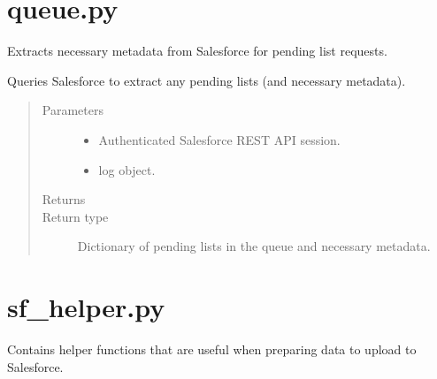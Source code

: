 \documentclass[letterpaper,10pt,english]{sphinxmanual}
\begin{document}
\label{\detokenize{index:module-ListManagement.utility.queue}}

\section{queue.py}
\label{\detokenize{index:queue-py}}
Extracts necessary metadata from Salesforce
for pending list requests.

\begin{fulllineitems}
\label{\detokenize{index:ListManagement.utility.queue.build_queue}}
Queries Salesforce to extract any pending lists (and necessary metadata).
\begin{quote}\begin{description}
\item[{Parameters}] \leavevmode\begin{itemize}
\item {} 
 \textendash{} Authenticated Salesforce REST API session.

\item {} 
 \textendash{} log object.

\end{itemize}

\item[{Returns}] \leavevmode


\item[{Return type}] \leavevmode
Dictionary of pending lists in the queue and necessary metadata.

\end{description}\end{quote}

\end{fulllineitems}

\label{\detokenize{index:module-ListManagement.utility.sf_helper}}

\section{sf\_helper.py}
\label{\detokenize{index:sf-helper-py}}
Contains helper functions that are useful
when preparing data to upload to Salesforce.
\end{document}
